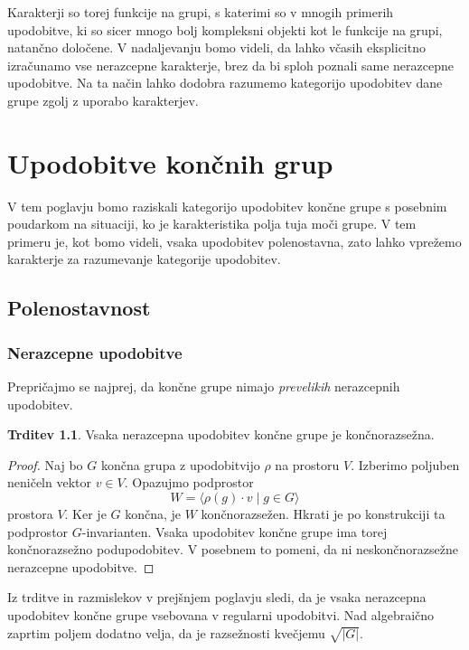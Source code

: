 \documentclass[11pt]{book}
\theoremstyle{definition}
\theoremstyle{zgled}
\theoremstyle{odprtproblem}
\theoremstyle{domacanaloga}
\newenvironment{dokaz}
    {\color{siva}\begin{proof}}
    {\end{proof}}
\theoremstyle{izrek}
\newtheorem*{trditev}{Trditev}
\begin{document}
Karakterji so torej funkcije na grupi, s katerimi so v mnogih primerih upodobitve, ki so sicer mnogo bolj kompleksni objekti kot le funkcije na grupi, natančno določene. V nadaljevanju bomo videli, da lahko včasih eksplicitno izračunamo vse nerazcepne karakterje, brez da bi sploh poznali same nerazcepne upodobitve. Na ta način lahko dodobra razumemo kategorijo upodobitev dane grupe zgolj z uporabo karakterjev.

\chapter{Upodobitve končnih grup}

V tem poglavju bomo raziskali kategorijo upodobitev končne grupe s posebnim poudarkom na situaciji, ko je karakteristika polja tuja moči grupe. V tem primeru je, kot bomo videli, vsaka upodobitev polenostavna, zato lahko vprežemo karakterje za razumevanje kategorije upodobitev.

\section{Polenostavnost}

\subsection{Nerazcepne upodobitve}

Prepričajmo se najprej, da končne grupe nimajo \emph{prevelikih} nerazcepnih upodobitev.

\begin{trditev}
Vsaka nerazcepna upodobitev končne grupe je končnorazsežna.
\end{trditev}
\begin{dokaz}
Naj bo $G$ končna grupa z upodobitvijo $\rho$ na prostoru $V$. Izberimo poljuben neničeln vektor $v \in V$. Opazujmo podprostor
\[
    W = \langle \rho(g) \cdot v \mid g \in G \rangle
\]
prostora $V$. Ker je $G$ končna, je $W$ končnorazsežen. Hkrati je po konstrukciji ta podprostor $G$-invarianten. Vsaka upodobitev končne grupe ima torej končnorazsežno podupodobitev. V posebnem to pomeni, da ni neskončnorazsežne nerazcepne upodobitve.
\end{dokaz}

Iz trditve in razmislekov v prejšnjem poglavju sledi, da je vsaka nerazcepna upodobitev končne grupe vsebovana v regularni upodobitvi. Nad algebraično zaprtim poljem dodatno velja, da je razsežnosti kvečjemu $\sqrt{|G|}$.
\end{document}
